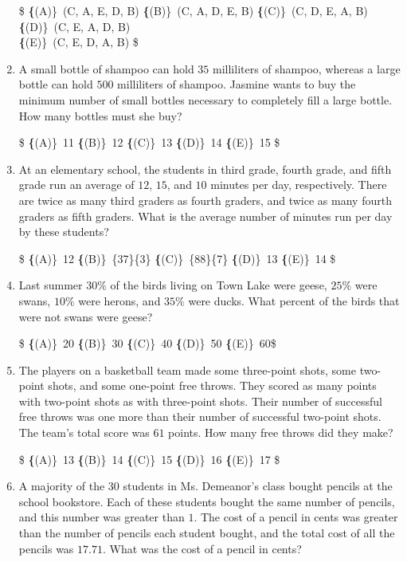 \documentclass{article}
\begin{document}
\begin{enumerate}[label=\arabic*., itemsep=0.5em]
\$
\textbf\{(A)\}\ (C, A, E, D, B) \qquad
\textbf\{(B)\}\ (C, A, D, E, B) \qquad
\textbf\{(C)\}\ (C, D, E, A, B) \qquad
\textbf\{(D)\}\ (C, E, A, D, B) \qquad \\
\textbf\{(E)\}\ (C, E, D, A, B) \$\par \vspace{0.5em}\item A small bottle of shampoo can hold $35$ milliliters of shampoo, whereas a large bottle can hold $500$ milliliters of shampoo. Jasmine wants to buy the minimum number of small bottles necessary to completely fill a large bottle. How many bottles must she buy?

\$
\textbf\{(A)\}\ 11 \qquad
\textbf\{(B)\}\ 12 \qquad
\textbf\{(C)\}\ 13 \qquad
\textbf\{(D)\}\ 14 \qquad
\textbf\{(E)\}\ 15 \$\par \vspace{0.5em}\item At an elementary school, the students in third grade, fourth grade, and fifth grade run an average of $12$, $15$, and $10$ minutes per day, respectively. There are twice as many third graders as fourth graders, and twice as many fourth graders as fifth graders. What is the average number of minutes run per day by these students?

\$
\textbf\{(A)\}\ 12 \qquad
\textbf\{(B)\}\ \frac\{37\}\{3\} \qquad
\textbf\{(C)\}\ \frac\{88\}\{7\} \qquad
\textbf\{(D)\}\ 13 \qquad
\textbf\{(E)\}\ 14 \$\par \vspace{0.5em}\item Last summer $30\%$ of the birds living on Town Lake were geese, $25\%$ were swans, $10\%$ were herons, and $35\%$ were ducks. What percent of the birds that were not swans were geese?
 
\$
\textbf\{(A)\}\ 20 \qquad
\textbf\{(B)\}\ 30 \qquad
\textbf\{(C)\}\ 40 \qquad
\textbf\{(D)\}\ 50 \qquad
\textbf\{(E)\}\ 60\$\par \vspace{0.5em}\item The players on a basketball team made some three-point shots, some two-point shots, and some one-point free throws. They scored as many points with two-point shots as with three-point shots. Their number of successful free throws was one more than their number of successful two-point shots. The team's total score was $61$ points. How many free throws did they make?
 
\$
\textbf\{(A)\}\ 13 \qquad
\textbf\{(B)\}\ 14 \qquad
\textbf\{(C)\}\ 15 \qquad
\textbf\{(D)\}\ 16 \qquad
\textbf\{(E)\}\ 17 \$\par \vspace{0.5em}\item A majority of the $30$ students in Ms. Demeanor's class bought pencils at the school bookstore. Each of these students bought the same number of pencils, and this number was greater than $1$. The cost of a pencil in cents was greater than the number of pencils each student bought, and the total cost of all the pencils was $17.71$. What was the cost of a pencil in cents?


\end{enumerate}
\end{document}
